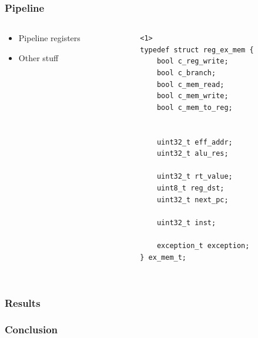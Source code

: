 \documentclass{beamer}
\begin{document}
\begin{frame}[fragile]
\frametitle{Pipeline}
\begin{columns}
\begin{column}{0.5\textwidth}

\begin{itemize}
	\item<1> Pipeline registers
	\item<2> Other stuff
\end{itemize}

\end{column}

\begin{column}{0.5\textwidth}

\begin{lstlisting}<1>
typedef struct reg_ex_mem {
	bool c_reg_write;
	bool c_branch;
	bool c_mem_read;
	bool c_mem_write;
	bool c_mem_to_reg;


	uint32_t eff_addr;
	uint32_t alu_res;

	uint32_t rt_value;
	uint8_t reg_dst;
	uint32_t next_pc;

	uint32_t inst;

	exception_t exception;
} ex_mem_t;


\end{lstlisting}


\end{column}
\end{columns}

\end{frame}


\begin{frame}
\frametitle{Results}



\end{frame}


\begin{frame}
\frametitle{Conclusion}
\end{frame}
\end{document}
